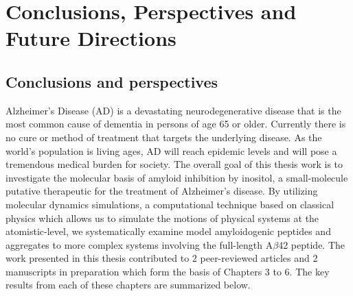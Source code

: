 \chapter{Conclusions, Perspectives and Future Directions}





\section{Conclusions and perspectives}
Alzheimer's Disease (AD) is a devastating neurodegenerative disease that is the most common cause of dementia in persons of age 65 or older. Currently there is no cure or method of treatment that targets the underlying disease.  As the world's population is living ages, AD will reach epidemic levels and will pose a tremendous medical burden for society. The overall goal of this thesis work is to investigate the molecular basis of amyloid inhibition by inositol, a small-molecule putative therapeutic for the treatment of Alzheimer's disease. By utilizing molecular dynamics simulations, a computational technique based on classical physics which allows us to simulate the motions of physical systems at the atomistic-level, we systematically examine model amyloidogenic peptides and aggregates to more complex systems involving the full-length A$\beta$42 peptide. The work presented in this thesis contributed to 2 peer-reviewed articles and 2 manuscripts in preparation which form the basis of Chapters 3 to 6.  The key results from each of these chapters are summarized below.

